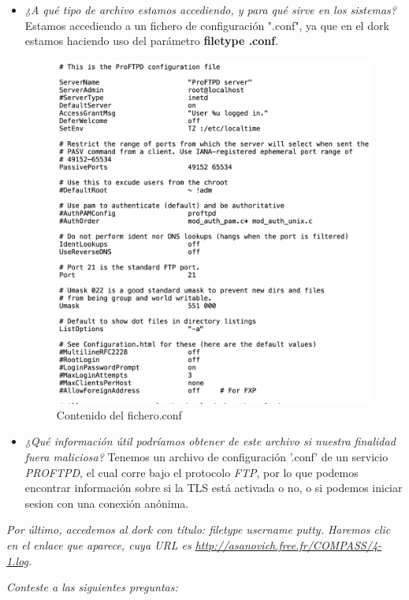 \documentclass[12pt]{book}
\begin{document}
\begin{itemize}
    \item \textit{¿A qué tipo de archivo estamos accediendo, y para qué sirve en los sistemas?}
    \newline
    Estamos accediendo a un fichero de configuración ".conf", ya que en el dork estamos haciendo uso del parámetro \textbf{filetype .conf}.

    \begin{figure}[h]
        \centering
        \includegraphics[width=.75\linewidth]{Practica 3y4/images/Screenshot 2024-10-24 at 09.37.30.png}
        \caption{Contenido del fichero.conf}
        \label{fig:enter-label}
    \end{figure}
    
    \item \textit{¿Qué información útil podríamos obtener de este archivo si nuestra finalidad fuera maliciosa?}
    \newline
    Tenemos un archivo de configuración '.conf' de un servicio \textit{PROFTPD}, el cual corre bajo el protocolo \textit{FTP}, por lo que podemos encontrar información sobre si la TLS está activada o no, o si podemos iniciar sesion con una conexión anónima.
\end{itemize}

\textit{Por último, accedemos al dork con título: filetype
username putty. Haremos clic en el enlace que aparece, cuya URL es \url{http://asanovich.free.fr/COMPASS/4-1.log}.}

\textit{Conteste a las siguientes preguntas:}
\end{document}
